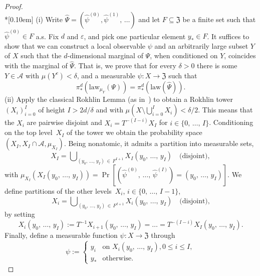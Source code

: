 \documentclass[AHL,Unicode,longabstracts]{cedram}
\newcommand{\clA}{\mathcal{A}}
\newcommand{\law}{\mathrm{law}}
\newcommand{\frkZ}{\mathfrak{Z}}
\begin{document}
\begin{proof}\ \\*[0.10em]
\noindent (i) Write $\widehat{\Psi}=(\widehat{\psi}^{(0)},\widehat{\psi} ^{(1)},\,\ldots)$ and let $F\subseteq\frkZ$ be a finite set such that $\widehat{\psi}^{(0)}\in F$ a.s. Fix $d$ and $\varepsilon$, and pick one particular element $y_{\ast}\in F$. It suffices to show that we can construct a local observable $\psi$ and an arbitrarily large subset $Y$ of $X$ such that the $d$-dimensional marginal of $\Psi$, when conditioned on $Y$, coincides with the marginal of $\widehat{\Psi}$. That is, we prove that for every $\delta>0$ there is some $Y\in\clA$ with $\mu(Y^{c})<\delta$, and a measurable $\psi:X\rightarrow\frkZ$ such that
\begin{equation} \label{Eq_awsawasa}
\pi_{\ast}^{d}\left(\law_{\mu_{Y}}(\Psi)\right)=\pi_{\ast}^{d}\left(\law \left(\widehat{\Psi}\right)\right).
\end{equation}
(ii) Apply the classical Rokhlin Lemma (as in~\cite[Lemma~7.4]{Z11}) to obtain a Rokhlin tower $(X_{i})_{i=0}^{I}$ of height $I>2d/\delta$ and with $\mu(X\setminus {\textstyle\bigcup\nolimits_{i=0}^{I}} X_{i})<\delta/2$. This means that the $X_{i}$ are pairwise disjoint and $X_{i}=T^{-(I-i)}X_{I}$ for $i\in\{0,\,\ldots,\,I\}$. Conditioning on the top level~$X_{I}$ of the tower we obtain the probability space $(X_{I},X_{I}
\cap\clA,\mu_{X_{I}})$. Being nonatomic, it admits a partition into measurable sets,
\[
X_{I}= {\textstyle\bigcup\nolimits_{\left(y_{0},\,\ldots,\,y_{I}\right)\,\in\,F^{I+1}}} X_{I}\left(y_{0},\,\ldots,\,y_{I}\right)\quad\text{(disjoint)},
\]
with $\mu_{X_{I}}(X_{I}(y_{0},\,\ldots,\,y_{I}))=\Pr[(\widehat{\psi}^{(0)},\,\ldots,\,\widehat{\psi}^{(I)})=(y_{0},\,\ldots,\,y_{I})]$. We define partitions of the other levels~$X_{i}$, $i\in\{0,\,\ldots,\,I-1\}$,
\[
X_{i}= {\textstyle\bigcup\nolimits_{\left(y_{0},\,\ldots,\,y_{I}\right)\,\in\,F^{I+1}}} X_{i}(y_{0},\,\ldots,\,y_{I})\quad\text{(disjoint),}
\]
by setting 
\[
X_{i}\left(y_{0},\,\ldots,\,y_{I}\right):=T^{-1}X_{i+1}\left(y_{0},\,\ldots,\,y_{I}\right)=\ldots=T^{-(I-i)}X_{I}\left(y_{0},\,\ldots,\,y_{I}\right).
\]
Finally, define a measurable function $\psi:X\rightarrow\frkZ$ through
\begin{equation}
\psi:=
\begin{cases}
y_{i} &\text{on }X_{i}\left(y_{0},\,\ldots,\,y_{I}\right), 0\leq i\leq I,\\
y_{\ast} &\text{otherwise}.
\end{cases}
\end{equation}

\end{proof}
\end{document}
